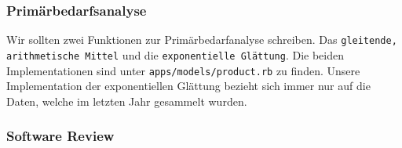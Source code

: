 \subsubsection{Prim\"arbedarfsanalyse}
Wir sollten zwei Funktionen zur Prim\"arbedarfanalyse schreiben. Das \texttt{gleitende, arithmetische Mittel} und die \texttt{exponentielle Gl\"attung}. Die beiden Implementationen sind unter \texttt{apps/models/product.rb} zu finden. Unsere Implementation der exponentiellen Gl\"attung bezieht sich immer nur auf die Daten, welche im letzten Jahr gesammelt wurden.

\subsubsection{Software Review}
